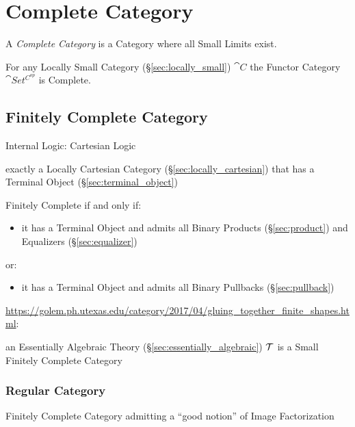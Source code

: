 \section{Complete Category}\label{sec:complete_category}

A \emph{Complete Category} is a Category where all Small Limits exist.

For any Locally Small Category (\S\ref{sec:locally_small})
$\cat{C}$ the Functor Category $\cat{Set^{C^{op}}}$ is Complete.



\subsection{Finitely Complete Category}\label{sec:finitely_complete}

Internal Logic: Cartesian Logic %

exactly a Locally Cartesian Category (\S\ref{sec:locally_cartesian})
that has a Terminal Object (\S\ref{sec:terminal_object})

Finitely Complete if and only if:
\begin{itemize}
  \item it has a Terminal Object and admits all Binary Products
    (\S\ref{sec:product}) and Equalizers (\S\ref{sec:equalizer})
\end{itemize}
or:
\begin{itemize}
  \item it has a Terminal Object and admits all Binary Pullbacks
    (\S\ref{sec:pullback})
\end{itemize}

\url{https://golem.ph.utexas.edu/category/2017/04/gluing_together_finite_shapes.html}:

an Essentially Algebraic Theory (\S\ref{sec:essentially_algebraic})
$\mathcal{T}$ is a Small Finitely Complete Category



\subsubsection{Regular Category}\label{sec:regular_category}

Finitely Complete Category admitting a ``good notion'' of Image
Factorization

